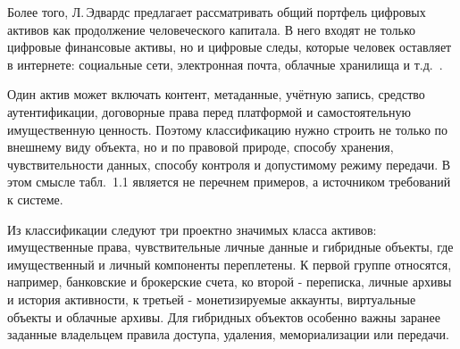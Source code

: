 Более того, Л.\,Эдвардс предлагает рассматривать общий портфель цифровых активов как продолжение человеческого капитала. В него входят не только цифровые финансовые активы, но и цифровые следы, которые человек оставляет в интернете: социальные сети, электронная почта, облачные хранилища и т.д.~\cite{Edwards2013PostMortemPrivacy}.

Один актив может включать контент, метаданные, учётную запись, средство аутентификации, договорные права перед платформой и самостоятельную имущественную ценность. Поэтому классификацию нужно строить не только по внешнему виду объекта, но и по правовой природе, способу хранения, чувствительности данных, способу контроля и допустимому режиму передачи. В этом смысле табл.~1.1 является не перечнем примеров, а источником требований к системе.

Из классификации следуют три проектно значимых класса активов: имущественные права, чувствительные личные данные и гибридные объекты, где имущественный и личный компоненты переплетены. К первой группе относятся, например, банковские и брокерские счета, ко второй - переписка, личные архивы и история активности, к третьей - монетизируемые аккаунты, виртуальные объекты и облачные архивы. Для гибридных объектов особенно важны заранее заданные владельцем правила доступа, удаления, мемориализации или передачи.

